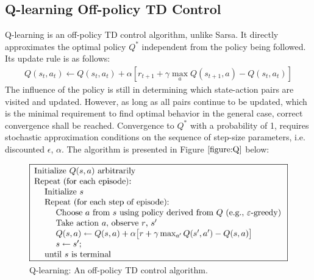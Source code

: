 \documentclass[paper=a4, fontsize=11pt]{scrartcl}
\numberwithin{equation}{section}		%
\numberwithin{figure}{section}			%
\numberwithin{table}{section}				%
\begin{document}
\subsection*{Q-learning Off-policy TD Control}
Q-learning is an off-policy TD control algorithm, unlike Sarsa. It directly approximates the optimal policy $Q^*$ independent from the policy being followed. Its update rule is as follows:
\begin{align}
Q(s_t,a_t) \leftarrow Q(s_t,a_t)+\alpha[r_{t+1}+\gamma \max_a Q(s_{t+1},a)-Q(s_t,a_t)]
\end{align}
The influence of the policy is still in determining which state-action pairs are visited and updated. However, as long as all pairs continue to be updated, which is the minimal requirement to find optimal behavior in the general case, correct convergence shall be reached. Convergence to $Q^*$ with a probability of 1, requires stochastic approximation conditions on the sequence of step-size parameters, i.e. discounted $\epsilon$, $\alpha$. The algorithm is presented in Figure $\ref{figure:Q}$ below:
\begin{figure}[H] \centering
\includegraphics[scale=0.6]{pseudotmp9.png}
\caption{Q-learning: An off-policy TD control algorithm.} \label{figure:Q}
\end{figure}

\end{document}
